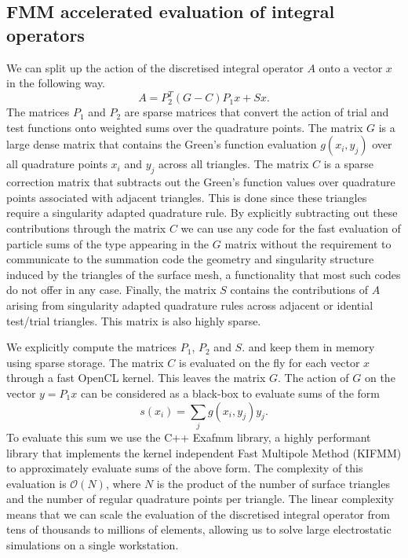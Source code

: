 \subsection{FMM accelerated evaluation of integral operators}
We can split up the action of the discretised integral operator $A$ onto a vector $x$ in the following way.
$$
A = P_2^T (G - C)P_1x + Sx.
$$
The matrices $P_1$ and $P_2$ are sparse matrices that convert the action of trial and test functions onto weighted sums over the quadrature points. The matrix $G$ is a large dense matrix that contains the Green's function evaluation $g(x_i, y_j)$ over all quadrature points $x_i$ and $y_j$ across all triangles. The matrix $C$ is a sparse correction matrix that subtracts out the Green's function values over quadrature points associated with  adjacent triangles. This is done since these triangles require a singularity adapted quadrature rule. By explicitly subtracting out these contributions through the matrix $C$ we can use any code for the fast evaluation of particle sums of the type appearing in the $G$ matrix without the requirement to communicate to the summation code the geometry and singularity structure induced by the triangles of the surface mesh, a functionality that most such codes do not offer in any case. Finally, the matrix $S$ contains the contributions of $A$ arising from singularity adapted quadrature rules across adjacent or idential test/trial triangles. This matrix is also highly sparse.

We explicitly compute the matrices $P_1$, $P_2$ and $S$. and keep them in memory using sparse storage. The matrix $C$ is evaluated on the fly for each vector $x$ through a fast OpenCL kernel. This leaves the matrix $G$. The action of $G$ on the vector $y=P_1x$ can be considered as a black-box to evaluate sums of the form
$$
s(x_i) = \sum_jg(x_i, y_j)y_j.
$$
To evaluate this sum we use the C++ Exafmm library, a highly performant library that implements the kernel independent Fast Multipole Method (KIFMM) to approximately evaluate sums of the above form. The complexity of this evaluation is $\mathcal{O}(N)$, where $N$ is the product of the number of surface triangles and the number of regular quadrature points per triangle. The linear complexity means that we can scale the evaluation of the discretised integral operator from tens of thousands to millions of elements, allowing us to solve large  electrostatic simulations on a single workstation.